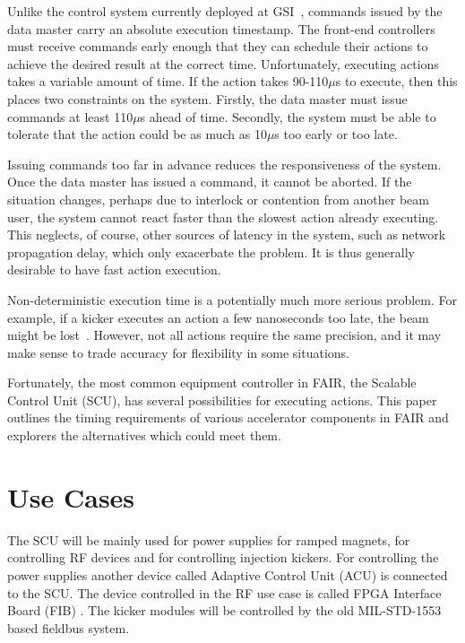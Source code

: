 \documentclass{JAC2003}
\begin{document}
Unlike the control system currently deployed at GSI~\cite{old-gsi},
commands issued by the data master carry an absolute execution timestamp.
The front-end controllers must receive commands early enough 
that they can schedule their actions 
to achieve the desired result at the correct time.
Unfortunately, executing actions takes a variable amount of time.
If the action takes 90-110$\mu$s to execute, 
then this places two constraints on the system.
Firstly, the data master must issue commands at least 110$\mu$s ahead of time.
Secondly, the system must be able to tolerate that the action could be as
much as 10$\mu$s too early or too late.

Issuing commands too far in advance reduces the responsiveness of the system.
Once the data master has issued a command, it cannot be aborted.
If the situation changes,
perhaps due to interlock or contention from another beam user,
the system cannot react faster than the slowest action already executing.
This neglects, of course, other sources of latency in the system,
such as network propagation delay, which only exacerbate the problem.
It is thus generally desirable to have fast action execution.

Non-deterministic execution time is a potentially much more serious problem.
For example, if a kicker executes an action a few nanoseconds too late,
the beam might be lost~\cite{kicker}.
However, not all actions require the same precision,
and it may make sense to trade accuracy for flexibility in some situations.

Fortunately, the  most common equipment controller in FAIR, 
the Scalable Control Unit (SCU),
has several possibilities for executing actions.
This paper outlines the timing requirements of various accelerator
components in FAIR and explorers the alternatives which could meet them.

\section{Use Cases}
The SCU will be mainly used for power supplies for ramped magnets, for controlling
RF devices and for controlling injection kickers.
For controlling the power supplies another device called Adaptive Control
Unit (ACU) \cite{acuref} is connected to the SCU. The device controlled in
the RF use case is called FPGA Interface Board (FIB) \cite{fibref}.
The kicker modules will be controlled by the old MIL-STD-1553 based fieldbus system.
\end{document}
